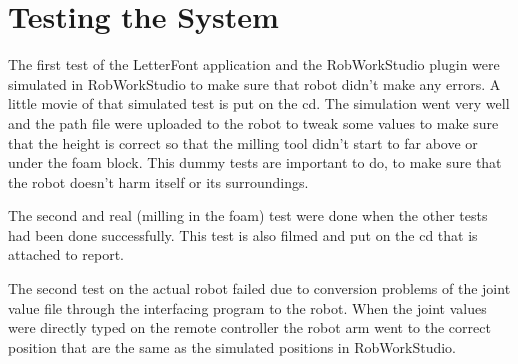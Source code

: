 \section{Testing the System}
\label{sec:test}

The first test of the LetterFont application and the RobWorkStudio plugin were simulated in RobWorkStudio to make sure that robot didn't make any errors. A little movie of that simulated test is put on the cd. The simulation went very well and the path file were uploaded to the robot to tweak some values to make sure that the height is correct so that the milling tool didn't start to far above or under the foam block. This dummy tests are important to do, to make sure that the robot doesn't harm itself or its surroundings.

The second and real (milling in the foam) test were done when the other tests had been done successfully. This test is also filmed and put on the cd that is attached to report.

The second test on the actual robot failed due to conversion problems of the joint value file through the interfacing program to the robot. When the joint values were directly typed on the remote controller the robot arm went to the correct position that are the same as the simulated positions in RobWorkStudio.